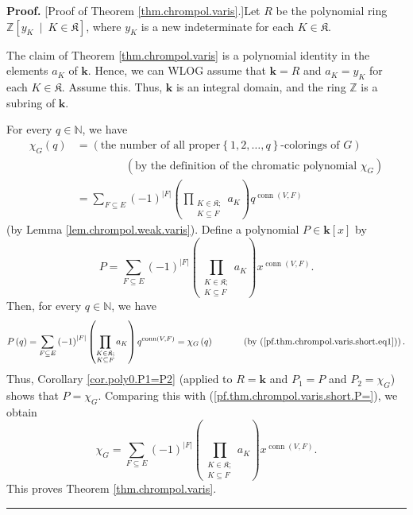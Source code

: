 \documentclass[numbers=enddot,12pt,final,onecolumn,notitlepage]{scrartcl}%
\theoremstyle{definition}
\newenvironment{proof}[1][Proof]{\noindent\textbf{#1.} }{\ \rule{0.5em}{0.5em}}
\newenvironment{vershort}{}{}
\let\sumnonlimits\sum
\let\prodnonlimits\prod
\renewcommand{\sum}{\sumnonlimits\limits}
\renewcommand{\prod}{\prodnonlimits\limits}
\begin{document}
\begin{vershort}
\begin{proof}
[Proof of Theorem \ref{thm.chrompol.varis}.]Let $R$ be the polynomial ring
$\mathbb{Z}\left[  y_{K}\ \mid\ K\in\mathfrak{K}\right]  $, where $y_{K}$ is a
new indeterminate for each $K\in\mathfrak{K}$.

The claim of Theorem \ref{thm.chrompol.varis} is a polynomial identity in the
elements $a_{K}$ of $\mathbf{k}$. Hence, we can WLOG assume that
$\mathbf{k}=R$ and $a_{K}=y_{K}$ for each $K\in\mathfrak{K}$. Assume this.
Thus, $\mathbf{k}$ is an integral domain, and the ring $\mathbb{Z}$ is a
subring of $\mathbf{k}$.

For every $q\in\mathbb{N}$, we have%
\begin{align}
\chi_{G}\left(  q\right)   &  =\left(  \text{the number of all proper
}\left\{  1,2,\ldots,q\right\}  \text{-colorings of }G\right) \nonumber\\
&  \ \ \ \ \ \ \ \ \ \ \ \ \ \ \ \ \ \ \ \ \left(  \text{by the definition of
the chromatic polynomial }\chi_{G}\right) \nonumber\\
&  =\sum_{F\subseteq E}\left(  -1\right)  ^{\left\vert F\right\vert }\left(
\prod_{\substack{K\in\mathfrak{K};\\K\subseteq F}}a_{K}\right)
q^{\operatorname*{conn}\left(  V,F\right)  }
\label{pf.thm.chrompol.varis.short.eq1}%
\end{align}
(by Lemma \ref{lem.chrompol.weak.varis}). Define a polynomial $P\in
\mathbf{k}\left[  x\right]  $ by%
\begin{equation}
P=\sum_{F\subseteq E}\left(  -1\right)  ^{\left\vert F\right\vert }\left(
\prod_{\substack{K\in\mathfrak{K};\\K\subseteq F}}a_{K}\right)
x^{\operatorname*{conn}\left(  V,F\right)  }.
\label{pf.thm.chrompol.varis.short.P=}%
\end{equation}
Then, for every $q\in\mathbb{N}$, we have%
\[
P\left(  q\right)  =\sum_{F\subseteq E}\left(  -1\right)  ^{\left\vert
F\right\vert }\left(  \prod_{\substack{K\in\mathfrak{K};\\K\subseteq F}%
}a_{K}\right)  q^{\operatorname*{conn}\left(  V,F\right)  }=\chi_{G}\left(
q\right)  \ \ \ \ \ \ \ \ \ \ \left(  \text{by
(\ref{pf.thm.chrompol.varis.short.eq1})}\right)  .
\]
Thus, Corollary \ref{cor.poly0.P1=P2} (applied to $R=\mathbf{k}$ and $P_{1}=P$
and $P_{2}=\chi_{G}$) shows that $P=\chi_{G}$. Comparing this with
(\ref{pf.thm.chrompol.varis.short.P=}), we obtain%
\[
\chi_{G}=\sum_{F\subseteq E}\left(  -1\right)  ^{\left\vert F\right\vert
}\left(  \prod_{\substack{K\in\mathfrak{K};\\K\subseteq F}}a_{K}\right)
x^{\operatorname*{conn}\left(  V,F\right)  }.
\]
This proves Theorem \ref{thm.chrompol.varis}.
\end{proof}
\end{vershort}
\end{document}
